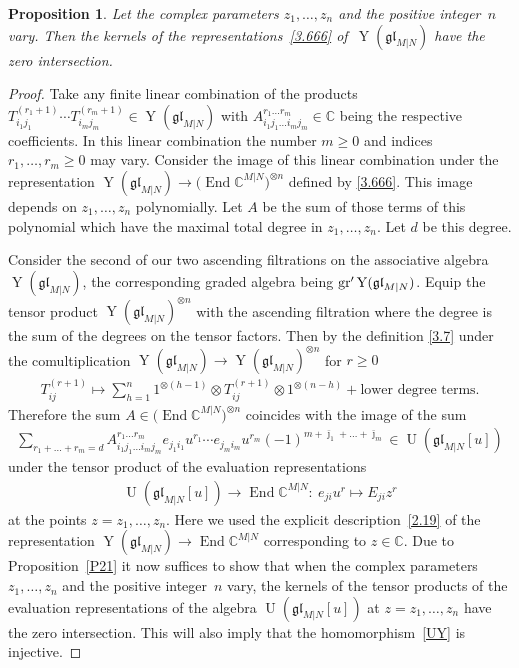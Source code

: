 \documentclass[pdftex]{sigma}
\numberwithin{equation}{section}
\newtheorem{Proposition}[Theorem]{Proposition}
\def\bj{{\bar\jmath }}
\def\CC{{\mathbb{C}}}
\def\CMN{\CC^{M|N}}
\def\End{\operatorname{End}}
\def\g{\glMN [u]}
\def\ge{\geqslant}
\def\glMN{\mathfrak{gl}_{M|N}}
\def\grpr{{\rm gr}^{\prime} }
\def\ot{\otimes}
\def\Ug{\operatorname{U}(\g)}
\def\YMN{\operatorname{Y}(\glMN)}
\begin{document}
\begin{Proposition}\label{P22}
Let the complex parameters $z_1,\dots, z_n$ and the positive integer~$n$ vary.
Then the kernels of the representations~\eqref{3.666} of~$\YMN$
have the zero intersection.
\end{Proposition}

\begin{proof}Take any finite linear combination of the products
$T_{i_1j_1}^{(r_1+1)}\cdots T_{i_mj_m}^{(r_m+1)}\in\YMN$ with
$
A_{i_1j_1\dots i_mj_m}^{r_1\dots r_m}\in\CC
$
being the respective coefficients.
In this linear combination the number $m\ge0$ and
indices $r_1,\dots, r_m\ge0$ may vary.
Consider the image of this linear combination
under the representation
$\YMN\to\big(\End\CMN\big)^{\ot n}$ defined by \eqref{3.666}.
This image depends on $z_1,\dots, z_n$ polynomially.
Let $A$ be the sum of those terms of
this polynomial which have the maximal total degree in $z_1,\dots, z_n $.
Let $d$ be this degree.

Consider the second of our two ascending filtrations
on the associative algebra $\YMN $,
the corresponding graded algebra being $\grpr\YMN $.
Equip the tensor product $\YMN^{\ot n}$ with the ascending
filtration where the degree is the sum of the degrees on the tensor factors.
Then by the definition \eqref{3.7}
under the comultiplication $\YMN\to\YMN^{\ot n}$ for $r\ge0$
\begin{gather*}
T_{ij}^{(r+1)}\mapsto
\sum_{h=1}^n
1^{\ot (h-1)}\ot T_{ij}^{(r+1)}\ot1^{\ot (n-h)}
 +
\text{lower degree terms.}
\end{gather*}
Therefore the sum $A\in\big(\End\CMN\big)^{\ot n}$
coincides with the image of the sum
\begin{gather*}
\sum_{r_1+\dots+r_m= d}
A_{i_1j_1\dots i_mj_m}^{r_1\dots r_m}
e_{j_1i_1} u^{r_1}\cdots e_{j_mi_m} u^{r_m}
(-1)^{m + \bj_1 + \dots + \bj_m}\in\Ug
\end{gather*}
under the tensor product of the evaluation representations
\begin{gather}\label{evalrep}
\Ug\to\End\CMN\colon \
e_{ji} u^{r}
\mapsto
E_{ji} z^{r}
\end{gather}
at the points $z=z_1,\dots, z_n $. Here we used the explicit
description~\eqref{2.19}
of the representation $\YMN\to\End\CMN$ corresponding to $z\in\CC $.
Due to Proposition~\ref{P21} it now
suffices to show that when the complex parameters $z_1,\dots, z_n$
and the positive integer~$n$ vary, the kernels
of the tensor products
of the evaluation representations
of the algebra $\Ug$ at $z=z_1,\dots, z_n$
have the zero intersection.
This will also imply that the homomorphism~\eqref{UY} is injective.


\end{proof}
\end{document}
